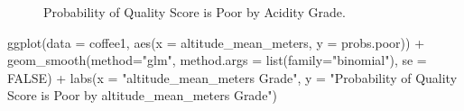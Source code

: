 \documentclass[
  letterpaper,
  DIV=11,
  numbers=noendperiod]{scrartcl}
\newenvironment{Shaded}{\begin{snugshade}}{\end{snugshade}}
\newcommand{\AttributeTok}[1]{\textcolor[rgb]{0.40,0.45,0.13}{#1}}
\newcommand{\ConstantTok}[1]{\textcolor[rgb]{0.56,0.35,0.01}{#1}}
\newcommand{\FunctionTok}[1]{\textcolor[rgb]{0.28,0.35,0.67}{#1}}
\newcommand{\NormalTok}[1]{\textcolor[rgb]{0.00,0.23,0.31}{#1}}
\newcommand{\SpecialCharTok}[1]{\textcolor[rgb]{0.37,0.37,0.37}{#1}}
\newcommand{\StringTok}[1]{\textcolor[rgb]{0.13,0.47,0.30}{#1}}
\begin{document}
\begin{figure}[H]


\caption{\label{fig-prob3}Probability of Quality Score is Poor by
Acidity Grade.}

\end{figure}%

\begin{Shaded}
\begin{Highlighting}[]
\FunctionTok{ggplot}\NormalTok{(}\AttributeTok{data =}\NormalTok{ coffee1, }\FunctionTok{aes}\NormalTok{(}\AttributeTok{x =}\NormalTok{ altitude\_mean\_meters, }\AttributeTok{y =}\NormalTok{ probs.poor)) }\SpecialCharTok{+}
  \FunctionTok{geom\_smooth}\NormalTok{(}\AttributeTok{method=}\StringTok{"glm"}\NormalTok{, }
              \AttributeTok{method.args =} \FunctionTok{list}\NormalTok{(}\AttributeTok{family=}\StringTok{"binomial"}\NormalTok{), }
              \AttributeTok{se =} \ConstantTok{FALSE}\NormalTok{) }\SpecialCharTok{+}
  \FunctionTok{labs}\NormalTok{(}\AttributeTok{x =} \StringTok{"altitude\_mean\_meters Grade"}\NormalTok{, }
       \AttributeTok{y =} \StringTok{"Probability of Quality Score is Poor by altitude\_mean\_meters Grade"}\NormalTok{)}
\end{Highlighting}
\end{Shaded}
\end{document}
